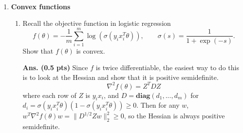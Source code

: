\documentclass{article}
\newcommand{\diag}{\mathbf{diag}}
\newcommand{\proj}{\mathbf{proj}}
\newcommand{\vnull}{\mathbf{null}}
\newcommand{\bmat}{\left[\begin{matrix}}
\newcommand{\emat}{\end{matrix}\right]}
\newcommand{\showsolution}[1]{\textbf{Ans.} \;#1}
\newcommand{\showsolutionpts}[2]{\textbf{Ans. (#1 pts)} \;#2}
\begin{document}
\begin{enumerate}
\begin{enumerate}
\begin{enumerate}
{}

\item Now suppose that $x^{(0)} = \bmat 1 \\ -1 \emat$. After $t$ iterations, what is $\proj_{\vnull(A)}(x^{(t)})$? Why?

\showsolution{
Using the same logic as in the previous part,  by linearity of projections, 
\[
\proj_{\vnull(A)}(x^{(t)}) = \proj_{\vnull(A)}(x^{(t-1)}) -\underbrace{\proj_{\vnull(A)}(\alpha A^T(Ax^{(t-1)}-b)) }_{=0} = \proj_{\vnull(A)}(x^{(0)}).
\]
Since $x^{(0)} = \bmat 1 \\ -1 \emat \in \vnull(A)$, then $\proj_{\vnull(A)}(x^{(t)}) = x^{(0)}$ for all $t$.
}

\item Now suppose that $\rho = 1$. For both cases of initial values, after $t$ iterations, what is $\proj_{\vnull(A)}(x^{(t)})$? Why?

\showsolution{
With regularization, the iteration scheme at each step now includes a multiplicative shrinking of $x^{(t)}$ at each step; namely,
\[
x^{(t+1)} = x^{(t)} - \underbrace{\alpha  A^T(Ax^{(t)}-b)}_{\in \vnull(A)} - \alpha x^{(t)}.
\]
So, now, at each step, 
\[
\proj_{\vnull(A)}(x^{(t)}) = (1-\alpha )\proj_{\vnull(A)}(x^{(t-1)}) = (1-\alpha )^t \proj_{\vnull(A)}(x^{(0)}).
\]
If $x^{(0)} = \bmat 0 \\ 0 \emat$, then this nullspace component is still 0 for all $t$. If $x^{(0)} = \bmat 1 \\ -1 \emat \in \vnull(A)$, then this component is $(1-\alpha)^t\bmat 1 \\ -1 \emat$, which for $\alpha < 1$, shrinks at each step.
}

\end{enumerate}

\end{enumerate}


\item \textbf{Convex functions} 

\begin{enumerate}
\item Recall the objective function in logistic regression
\[
f(\theta) = -\frac{1}{m}\sum_{i=1}^m \log(\sigma(y_ix_i^T\theta)), \qquad \sigma(s) = \frac{1}{1 + \exp(-s)}.
\]
Show that $f(\theta)$ is convex.

\showsolutionpts{0.5}{
Since $f$ is twice differentiable, the easiest way to do this is to look at the Hessian and show that it is positive semidefinite. 
\[
\nabla^2 f(\theta) = Z^TDZ
\]
where each row of $Z$ is $y_ix_i$, and $D = \diag(d_1,...,d_m)$ for $d_i = \sigma(y_ix_i^T\theta)(1-\sigma(y_ix_i^T\theta)) \geq 0$.
Then for any $w$, $w^T\nabla^2 f(\theta)w = \|D^{1/2}Zw\|_2^2\geq 0$, so the Hessian is always positive semidefinite.
}


\end{enumerate}
\end{enumerate}
\end{document}
